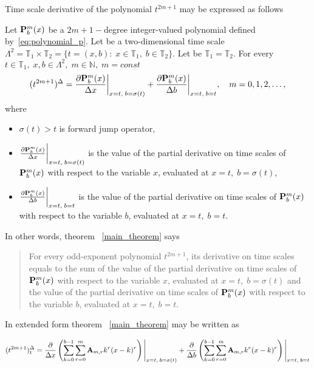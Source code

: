 Time scale derivative of the polynomial $t^{2m+1}$ may be expressed as follows
\begin{thm}
    \label{main_theorem}
    Let ${\mathbf{P}}\sp{m} \sb{b}(x)$ be a $2m+1-$degree integer-valued polynomial defined by~\eqref{eq:polynomial_p}.
    Let be a two-dimensional time scale
    $\Lambda^2 = \mathbb{T}_1 \times \mathbb{T}_2 = \{t=(x, b) \colon \; x\in\mathbb{T}_1, \; b\in\mathbb{T}_2 \}$.
    Let be $\mathbb{T}_1 = \mathbb{T}_2$.
    For every $t\in\mathbb{T}_1, \; x,b\in \Lambda^2, \; m\in\mathbb{N}, \; m = const$
    \[
        (t^{2m+1})^{\Delta} =
        \frac{\partial {\mathbf{P}}\sp{m} \sb{b}(x)}{\Delta x} \bigg |_{x = t, \; b = \sigma(t)}+
        \frac{\partial {\mathbf{P}}\sp{m} \sb{b}(x)}{\Delta b} \bigg |_{x = t, \; b = t}, \quad m = 0,1,2,\dots,
    \]
    where
    \begin{itemize}
        \setlength\itemsep{1em}
        \item  $\sigma(t) > t$ is forward jump operator,

        \item $\frac{\partial {\mathbf{P}}\sp{m} \sb{b}(x)}{\Delta x} \bigg |_{x = t, \; b = \sigma(t)}$
        is the value of the partial derivative on time scales of
        ${\mathbf{P}}\sp{m} \sb{b}(x)$ with respect to the variable $x$, evaluated at $x = t, \; b = \sigma(t)$,

        \item $\frac{\partial {\mathbf{P}}\sp{m} \sb{b}(x)}{\Delta b} \bigg |_{x = t, \; b = t}$
        is the value of the partial derivative on time scales of
        ${\mathbf{P}}\sp{m} \sb{b}(x)$ with respect to the variable $b$, evaluated at $x = t, \; b = t$.
    \end{itemize}
\end{thm}
In other words, theorem ~\ref{main_theorem} says
\begin{center}
    \begin{quotation}
        For every odd-exponent polynomial $t^{2m+1}$, its derivative on time scales equals to the sum
        of the value of the partial derivative on time scales of
        ${\mathbf{P}}\sp{m} \sb{b}(x)$
        with respect to the variable
        $x$,
        evaluated at
        $x = t, \; b = \sigma(t)$
        and the value of the partial derivative on time scales of
        ${\mathbf{P}}\sp{m} \sb{b}(x)$
        with respect to the variable
        $b$,
        evaluated at
        $x = t, \; b = t$.
    \end{quotation}
\end{center}

In extended form theorem ~\ref{main_theorem} may be written as

\begin{align*}
(t^{2m+1})
    ^{\Delta}_{t} =
    \frac{\partial}{\Delta x} \left( \sum_{k=0}^{b-1} \sum_{r=0}^{m} {\mathbf{A}} \sb{m,r} k^r(x-k)^r \right) \Bigg |_{x = t, \; b = \sigma(t)}
    + \frac{\partial}{\Delta b} \left( \sum_{k=0}^{b-1} \sum_{r=0}^{m} {\mathbf{A}} \sb{m,r} k^r(x-k)^r \right) \Bigg |_{x = t, \; b = t}
\end{align*}